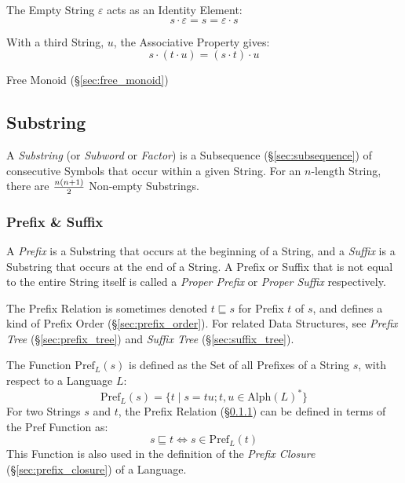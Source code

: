 The Empty String $\varepsilon$ acts as an Identity Element:
\[
  s \cdot \varepsilon = s = \varepsilon \cdot s
\]

With a third String, $u$, the Associative Property gives:
\[
  s \cdot (t \cdot u) = (s \cdot t) \cdot u
\]

Free Monoid (\S\ref{sec:free_monoid})



\subsection{Substring}\label{sec:substring}

A \emph{Substring} (or \emph{Subword} or \emph{Factor}) is a Subsequence
(\S\ref{sec:subsequence}) of consecutive Symbols that occur within a given
String. For an $n$-length String, there are $n(n+1) \over 2$ Non-empty
Substrings.



\subsubsection{Prefix \& Suffix}\label{sec:prefix_suffix}

A \emph{Prefix} is a Substring that occurs at the beginning of a String, and a
\emph{Suffix} is a Substring that occurs at the end of a String. A Prefix or
Suffix that is not equal to the entire String itself is called a \emph{Proper
  Prefix} or \emph{Proper Suffix} respectively.

The Prefix Relation is sometimes denoted $t \sqsubseteq s$ for Prefix $t$ of
$s$, and defines a kind of Prefix Order (\S\ref{sec:prefix_order}). For related
Data Structures, see \emph{Prefix Tree} (\S\ref{sec:prefix_tree}) and
\emph{Suffix Tree} (\S\ref{sec:suffix_tree}).

The Function $\mathrm{Pref}_L(s)$ is defined as the Set of all Prefixes of a
String $s$, with respect to a Language $L$:
\[
  \mathrm{Pref}_L(s) =
    \{ t\;|\;s = tu; t,u \in \mathrm{Alph}(L)^* \}
\]
For two Strings $s$ and $t$, the Prefix Relation (\S\ref{sec:prefix_suffix}) can
be defined in terms of the $\mathrm{Pref}$ Function as:
\[
  s \sqsubseteq t \Leftrightarrow s \in \mathrm{Pref}_L(t)
\]
This Function is also used in the definition of the \emph{Prefix Closure}
(\S\ref{sec:prefix_closure}) of a Language.



